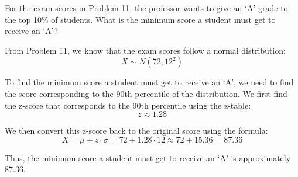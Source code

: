\documentclass[a4paper, 10pt]{article}
\begin{document}
\begin{problem}
For the exam scores in Problem 11, the professor wants to give an `A' grade to the top 10\% of students.
What is the minimum score a student must get to receive an
`A'?
\end{problem}

\begin{solution}
From Problem 11, we know that the exam scores follow a normal distribution: \[ X \sim N(72, 12^2) \]

To find the minimum score a student must get to receive an `A',
we need to find the score corresponding to the 90th percentile of the distribution.
We first find the z-score that corresponds to the 90th percentile using the z-table: \[ z \approx 1.28 \]

We then convert this z-score back to the original score using the formula:
\[ X = \mu + z \cdot \sigma = 72 + 1.28 \cdot 12 \approx 72 + 15.36 = 87.36 \]

Thus, the minimum score a student must get to receive an `A' is approximately \( \boxed{87.36} \).
\end{solution}
\end{document}
